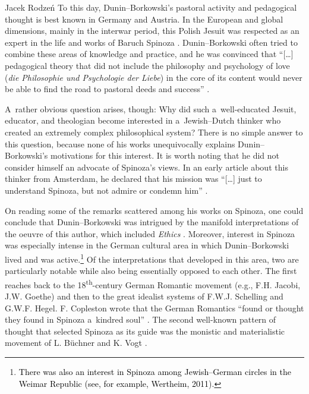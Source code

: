 \begin{artengenv}{Jacek Rodzeń}
To this day, Dunin–Borkowski's pastoral activity and pedagogical thought is best known in Germany and Austria. In the European and global dimensions, mainly in the interwar period, this Polish Jesuit was respected as an expert in the life and works of Baruch Spinoza
\parencite[cf.][p.139]{siwek_stanislaw_1935}. %
 Dunin–Borkowski often tried to combine these areas of knowledge and practice, and he was convinced that ``[…] pedagogical theory that did not include the philosophy and psychology of love (\textit{die Philosophie und Psychologie der Liebe}) in the core of its content would never be able to find the road to pastoral deeds and success'' 
\parencite[][p.43]{dunin-borkowski_autobiographie_1926}.%


A~rather obvious question arises, though: Why did such a~well-educated Jesuit, educator, and theologian become interested in a~Jewish–Dutch thinker who created an extremely complex philosophical system? There is no simple answer to this question, because none of his works unequivocally explains Dunin–Borkowski's motivations for this interest. It is worth noting that he did not consider himself an advocate of Spinoza's views. In an early article about this thinker from Amsterdam, he declared that his mission was ``[…] just to understand Spinoza, but not admire or condemn him''
\parencite[][p.126]{dunin-borkowski_leben_1902}.%


On reading some of the remarks scattered among his works on Spinoza, one could conclude that Dunin–Borkowski was intrigued by the manifold interpretations of the oeuvre of this author, which included \textit{Ethics}
\parencite[][p.30]{dunin-borkowski_junge_1910}. %
 Moreover, interest in Spinoza was especially intense in the German cultural area in which Dunin–Borkowski lived and was active.\footnote{\textcolor{black}{There was also an interest in Spinoza among Jewish–German circles in the Weimar Republic} \label{ref:RNDIm3uwTIgBl}\textcolor{black}{(see, for example, Wertheim, 2011})\textcolor{black}{.}} Of the interpretations that developed in this area, two are particularly notable while also being essentially opposed to each other. The first reaches back to the 18\textsuperscript{th}-century German Romantic movement (e.g., F.H. Jacobi, J.W. Goethe) and then to the great idealist systems of F.W.J. Schelling and G.W.F. Hegel. F. Copleston wrote that the German Romantics ``found or thought they found in Spinoza a~kindred soul'' 
\parencite[][p.261]{copleston_history_1994}. %
 The second well-known pattern of thought that selected Spinoza as its guide was the monistic and materialistic movement of L. Büchner and K. Vogt 
\parencite[cf.][]{pawlicki_spinoza_1912}.%



\end{artengenv}
